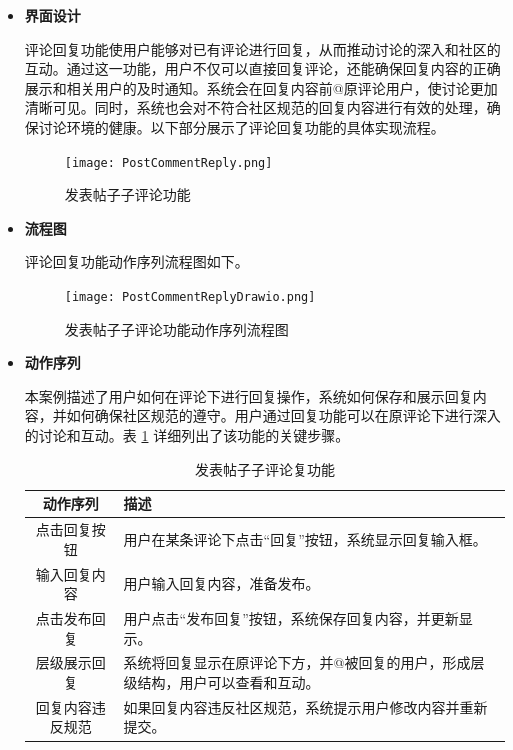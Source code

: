 \begin{itemize}
	\item \textbf{界面设计}
	
	评论回复功能使用户能够对已有评论进行回复，从而推动讨论的深入和社区的互动。通过这一功能，用户不仅可以直接回复评论，还能确保回复内容的正确展示和相关用户的及时通知。系统会在回复内容前@原评论用户，使讨论更加清晰可见。同时，系统也会对不符合社区规范的回复内容进行有效的处理，确保讨论环境的健康。以下部分展示了评论回复功能的具体实现流程。
	
	\begin{figure}[H]
		\centering
		\texttt{[image: PostCommentReply.png]} 
		\caption{发表帖子子评论功能}
		\label{fig:post-comment-reply}
	\end{figure}
	
	\item \textbf{流程图}
	
	评论回复功能动作序列流程图如下。
	
	\begin{figure}[H]
		\centering
		\texttt{[image: PostCommentReplyDrawio.png]} 
		\caption{发表帖子子评论功能动作序列流程图}
		\label{fig:post-comment-reply.drawio}
	\end{figure}
	
	\item \textbf{动作序列}
	
	本案例描述了用户如何在评论下进行回复操作，系统如何保存和展示回复内容，并如何确保社区规范的遵守。用户通过回复功能可以在原评论下进行深入的讨论和互动。表 \ref{table:comment-reply} 详细列出了该功能的关键步骤。
	
	\begin{table}[H]
		\centering
		\caption{发表帖子子评论复功能}
		\renewcommand\arraystretch{1.5}
		\begin{tabular}{|c|>{\raggedright\arraybackslash}p{8cm}|}
			\hline
			\textbf{动作序列} & \textbf{描述} \\ \hline
			点击回复按钮 & 用户在某条评论下点击“回复”按钮，系统显示回复输入框。 \\ \hline
			输入回复内容 & 用户输入回复内容，准备发布。 \\ \hline
			点击发布回复 & 用户点击“发布回复”按钮，系统保存回复内容，并更新显示。 \\ \hline
			层级展示回复 & 系统将回复显示在原评论下方，并@被回复的用户，形成层级结构，用户可以查看和互动。 \\ \hline
			回复内容违反规范 & 如果回复内容违反社区规范，系统提示用户修改内容并重新提交。 \\ \hline
		\end{tabular}
		\label{table:comment-reply}
	\end{table}
	

\end{itemize}
